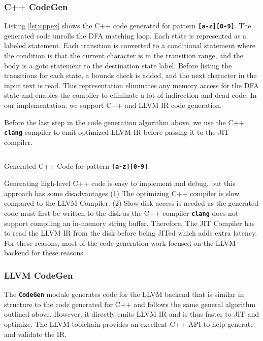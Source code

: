 \subsubsection{C++ CodeGen}
Listing \ref{lst:cppex} shows the C++ code generated for pattern \texttt{\textbf{[a-z][0-9]}}. The generated code unrolls the DFA matching loop. Each state is represented as a labeled statement. Each transition is converted to a conditional statement where the condition is that the current character is in the transition range, and the body is a goto statement to the destination state label. Before listing the transitions for each state, a bounds check is added, and the next character in the input text is read. This representation eliminates any memory access for the DFA state and enables the compiler to eliminate a lot of indirection and dead code. In our implementation, we support C++ and LLVM IR code generation.

Before the last step in the code generation algorithm above, we use the C++ \texttt{\textbf{clang}} compiler to emit optimized LLVM IR before passing it to the JIT compiler.

\begin{listing}[htbp]
\inputminted[breaklines,frame=lines,linenos]{cpp}{code/ex.cpp}
\caption{Generated C++ Code for pattern \texttt{\textbf{[a-z][0-9]}}.}
\label{lst:cppex}
\end{listing}

Generating high-level C++ code is easy to implement and debug, but this approach has some disadvantages (1) The optimizing C++ compiler is slow compared to the LLVM Compiler. (2) Slow disk access is needed as the generated code must first be written to the disk as the C++ compiler \texttt{\textbf{clang}} does not support compiling an in-memory string buffer. Therefore, The JIT Compiler has to read the LLVM IR from the disk before being JITed which adds extra latency. For these reasons, most of the code-generation work focused on the LLVM backend for these reasons.

\subsubsection{LLVM CodeGen}
The \texttt{\textbf{CodeGen}} module generates code for the LLVM backend that is similar in structure to the code generated for C++ and follows the same general algorithm outlined above. However, it directly emits LLVM IR and is thus faster to JIT and optimize. The LLVM toolchain provides an excellent C++ API \cite{llvmapi} to help generate and validate the IR.

